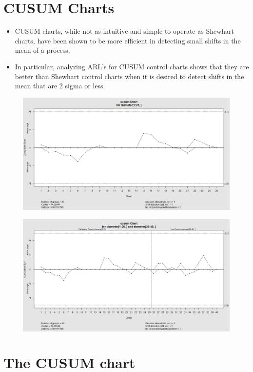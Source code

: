 \documentclass[SPC-MASTER.tex]{subfiles}
\begin{document}
\Large
\section{CUSUM Charts}
\begin{itemize}
\item CUSUM charts, while not as intuitive and simple to operate as Shewhart charts, have been shown to be more efficient in detecting small shifts in the mean of a process. \item In particular, analyzing ARL's for CUSUM control charts shows that they are better than Shewhart control charts when it is desired to detect shifts in the mean that are 2 sigma or less.
\end{itemize}




\begin{figure}[h!]
\centering
\includegraphics[width=0.7\linewidth]{images/CUSUMorings1}
\caption{}
\label{fig:CUSUMorings1}
\end{figure}

\begin{figure}[h!]
\centering
\includegraphics[width=0.7\linewidth]{images/CUSUMorings2}
\caption{}
\label{fig:CUSUMorings2}
\end{figure}

\section{The CUSUM chart}
\end{document}
